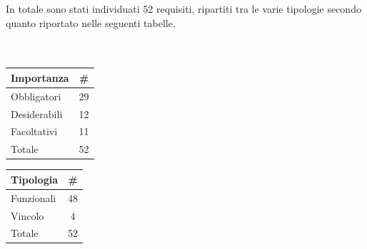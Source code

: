 In totale sono stati individuati 52 requisiti, ripartiti tra le varie tipologie secondo quanto riportato nelle seguenti tabelle.
\\ \\ \\
\begin{minipage}{\textwidth}
  \begin{minipage}[b]{0.49\textwidth}
    \centering
      \begin{tabular}{|l|c|} \hline
      \textbf{Importanza} & \textbf{\#} \\ \hline
  Obbligatori & 29 \\ \hline
  Desiderabili & 12 \\ \hline
  Facoltativi & 11 \\ \hline
  Totale & 52 \\ \hline
\end{tabular}
	\end{minipage}
	  \hfill
  \begin{minipage}[b]{0.49\textwidth}
    \centering
         \begin{tabular}{|l|c|} \hline
      \textbf{Tipologia} & \textbf{\#} \\ \hline
  Funzionali & 48 \\ \hline
  Vincolo & 4 \\ \hline
    Totale & 52 \\ \hline
\end{tabular}
  \end{minipage}
\end{minipage}
 \\ \\ \\

